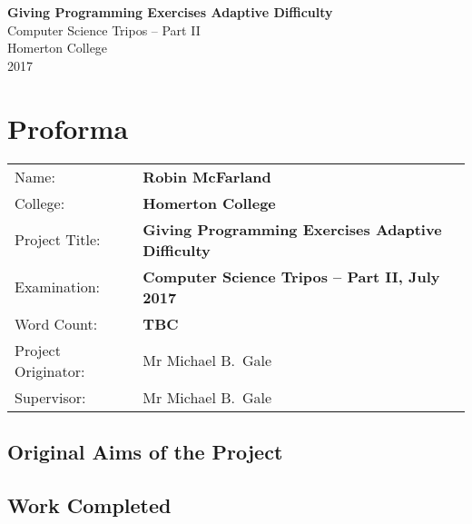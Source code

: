 \documentclass[12pt,a4paper,twoside,openright]{report}
\begin{document}





\pagestyle{empty}


\vspace*{60mm}
\begin{center}
\Huge
\textbf{Giving Programming Exercises Adaptive Difficulty} \\[5mm]
Computer Science Tripos -- Part II \\[5mm]
Homerton College \\[5mm]
2017
\end{center}


\pagestyle{plain}

\chapter*{Proforma}

{\large
\begin{tabular}{ll}
Name:               & \bf Robin McFarland                       \\
College:            & \bf Homerton College                     \\
Project Title:      & \bf Giving Programming Exercises Adaptive Difficulty \\
Examination:        & \bf Computer Science Tripos -- Part II, July 2017  \\
Word Count:         & \bf TBC  \\
Project Originator: & Mr Michael B.~Gale                   \\
Supervisor:         & Mr Michael B.~Gale                    \\ 
\end{tabular}
}

\section*{Original Aims of the Project}


\section*{Work Completed}
\end{document}

